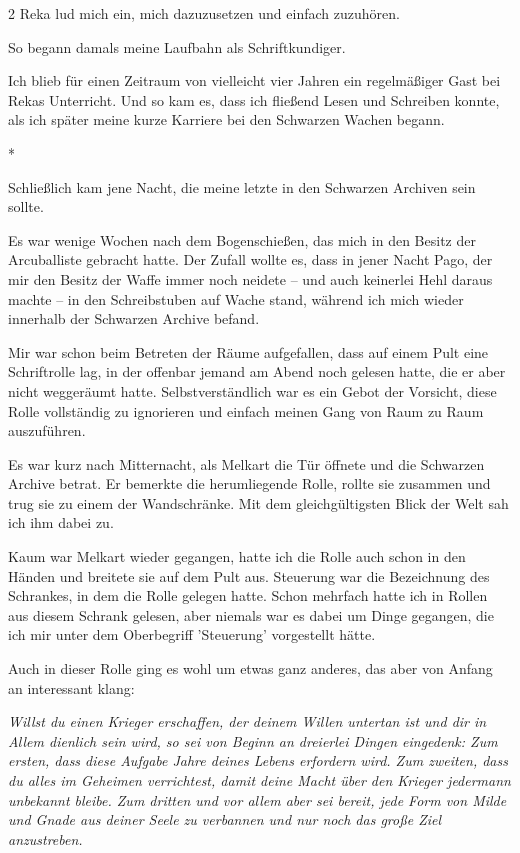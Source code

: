 \documentclass[10pt, a4paper, oneside]{book}
\begin{document}
\begin{multicols}{2}
Reka lud mich ein, mich dazuzusetzen und einfach zuzuhören.

So begann damals meine Laufbahn als Schriftkundiger.

Ich blieb für einen Zeitraum von vielleicht vier Jahren ein regelmäßiger Gast bei Rekas Unterricht. Und so kam es, dass ich fließend Lesen und Schreiben konnte, als ich später meine kurze Karriere bei den Schwarzen Wachen begann.

\begin{center}
    *
\end{center}

Schließlich kam jene Nacht, die meine letzte in den Schwarzen Archiven sein
sollte.

Es war wenige Wochen nach dem Bogenschießen, das mich in den Besitz der Arcuballiste gebracht hatte. Der Zufall wollte es, dass in jener Nacht Pago, der mir den Besitz der Waffe immer noch neidete – und auch keinerlei Hehl daraus machte – in den Schreibstuben auf Wache stand, während ich mich wieder innerhalb der Schwarzen Archive befand.

Mir war schon beim Betreten der Räume aufgefallen, dass auf einem Pult eine Schriftrolle lag, in der offenbar jemand am Abend noch gelesen hatte, die er aber nicht weggeräumt hatte. Selbstverständlich war es ein Gebot der Vorsicht, diese Rolle vollständig zu ignorieren und einfach meinen Gang von Raum zu Raum auszuführen.

Es war kurz nach Mitternacht, als Melkart die Tür öffnete und die Schwarzen Archive betrat. Er bemerkte die herumliegende Rolle, rollte sie zusammen und trug sie zu einem der Wandschränke. Mit dem gleichgültigsten Blick der Welt sah ich ihm dabei zu.

Kaum war Melkart wieder gegangen, hatte ich die Rolle auch schon in den Händen und breitete sie auf dem Pult aus. Steuerung war die Bezeichnung des Schrankes, in dem die Rolle gelegen hatte. Schon mehrfach hatte ich in Rollen aus diesem Schrank gelesen, aber niemals war es dabei um Dinge gegangen, die ich mir unter dem Oberbegriff 'Steuerung' vorgestellt hätte.

Auch in dieser Rolle ging es wohl um etwas ganz anderes, das aber von Anfang an interessant klang:

\textit{Willst du einen Krieger erschaffen, der deinem Willen untertan ist und dir in Allem dienlich sein wird, so sei von Beginn an dreierlei Dingen eingedenk: Zum ersten, dass diese Aufgabe Jahre deines Lebens erfordern wird. Zum zweiten, dass du alles im Geheimen verrichtest, damit deine Macht über den Krieger jedermann unbekannt bleibe. Zum dritten und vor allem aber sei bereit, jede Form von Milde und Gnade aus deiner Seele zu verbannen und nur noch das große Ziel anzustreben.}


\end{multicols}
\end{document}
